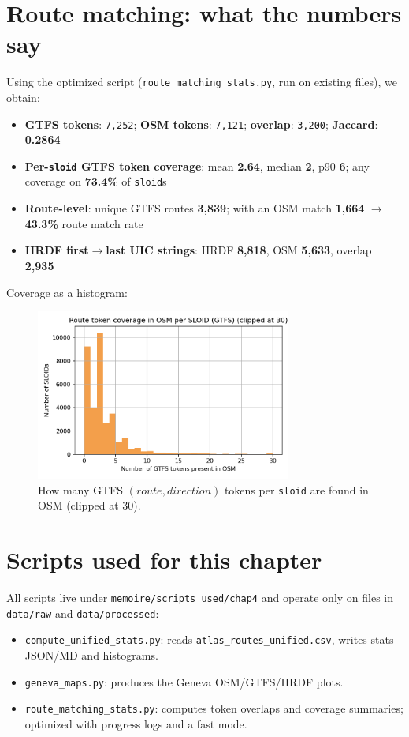 \section{Route matching: what the numbers say}
Using the optimized script (\texttt{route\_matching\_stats.py}, run on existing files), we obtain:
\begin{itemize}
  \item \textbf{GTFS tokens}: \texttt{7,252}; \textbf{OSM tokens}: \texttt{7,121}; \textbf{overlap}: \texttt{3,200}; \textbf{Jaccard}: \textbf{0.2864}
  \item \textbf{Per-\texttt{sloid} GTFS token coverage}: mean \textbf{2.64}, median \textbf{2}, p90 \textbf{6}; any coverage on \textbf{73.4\%} of \texttt{sloid}s
  \item \textbf{Route-level}: unique GTFS routes \textbf{3,839}; with an OSM match \textbf{1,664} $\rightarrow$ \textbf{43.3\%} route match rate
  \item \textbf{HRDF first$\rightarrow$last UIC strings}: HRDF \textbf{8,818}, OSM \textbf{5,633}, overlap \textbf{2,935}
\end{itemize}
Coverage as a histogram:
\begin{figure}[h]
  \centering
  \includegraphics[width=0.75\textwidth]{../figures/chap4/hist_route_token_coverage_per_sloid.png}
  \caption{How many GTFS \((route, direction)\) tokens per \texttt{sloid} are found in OSM (clipped at 30).}
\end{figure}

\section{Scripts used for this chapter}
All scripts live under \texttt{memoire/scripts\_used/chap4} and operate only on files in \texttt{data/raw} and \texttt{data/processed}:
\begin{itemize}
  \item \texttt{compute\_unified\_stats.py}: reads \texttt{atlas\_routes\_unified.csv}, writes stats JSON/MD and histograms.
  \item \texttt{geneva\_maps.py}: produces the Geneva OSM/GTFS/HRDF plots.
  \item \texttt{route\_matching\_stats.py}: computes token overlaps and coverage summaries; optimized with progress logs and a fast mode.
\end{itemize}

